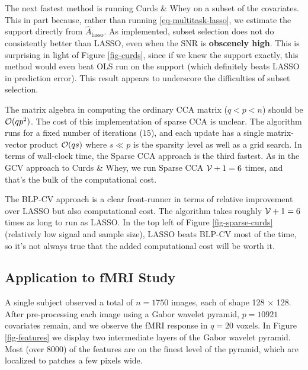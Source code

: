 \documentclass[main]{subfiles}
\begin{document}
The next fastest method is running Curds \& Whey on a subset of the covariates. This in part because, rather than running \eqref{eq-multitask-lasso}, we estimate the support directly from $\widehat{A}_{\text{lasso}}$. As implemented, subset selection does not do consistently better than LASSO, even when the SNR is {\bf obscenely high}. This is surprising in light of Figure \ref{fig-curds}, since if we knew the support exactly, this method would even beat OLS run on the support (which definitely beats LASSO in prediction error). This result appears to underscore the difficulties of subset selection.

The matrix algebra in computing the ordinary CCA matrix ($q<p<n$) should be $\mathcal{O}(qp^2)$. The cost of this implementation of sparse CCA is unclear. The algorithm runs for a fixed number of iterations ($15$), and each update has a single matrix-vector product $\mathcal{O}(qs)$ where $s\ll p$ is the sparsity level as well as a grid search. In terms of wall-clock time, the Sparse CCA approach is the third fastest. As in the GCV approach to Curds \& Whey, we run Sparse CCA $\mathcal{V} + 1 = 6$ times, and that's the bulk of the computational cost.

The BLP-CV approach is a clear front-runner in terms of relative improvement over LASSO but also computational cost. The algorithm takes roughly $\mathcal{V}+1 = 6$ times as long to run as LASSO. In the top left of Figure \ref{fig-sparse-curds} (relatively low signal and sample size), LASSO beats BLP-CV most of the time, so it's not always true that the added computational cost will be worth it.

\subsection{Application to fMRI Study}

A single subject observed a total of $n = 1750$ images, each of shape 128 $\times$ 128. After pre-processing each image using a Gabor wavelet pyramid, $p = 10921$ covariates remain, and we observe the fMRI response in $q=20$ voxels. In Figure \ref{fig-features} we display two intermediate layers of the Gabor wavelet pyramid. Most (over $8000$) of the features are on the finest level of the pyramid, which are localized to patches a few pixels wide.
\end{document}
